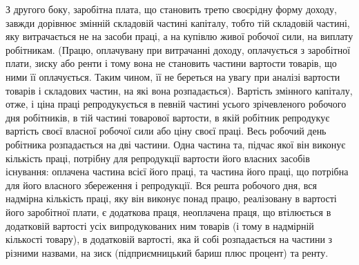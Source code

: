 З другого боку, заробітна плата, що становить третю своєрідну форму
доходу, завжди дорівнює змінній складовій частині капіталу, тобто тій складовій
частині, яку витрачається не на засоби праці, а на купівлю живої робочої
сили, на виплату робітникам. (Працю, оплачувану при витрачанні доходу, оплачується
з заробітної плати, зиску або ренти і тому вона не становить частини
вартости товарів, що ними її оплачується. Таким чином, її не береться на увагу
при аналізі вартости товарів і складових частин, на які вона розпадається).
Вартість змінного капіталу, отже, і ціна праці репродукується в певній частині
усього зрічевленого робочого дня робітників, в тій частині товарової вартости,
в якій робітник репродукує вартість своєї власної робочої сили або ціну своєї
праці. Весь робочий день робітника розпадається на дві частини. Одна частина
та, підчас якої він виконує кількість праці, потрібну для репродукції вартости
його власних засобів існування: оплачена частина всієї його праці, та частина
його праці, що потрібна для його власного збереження і репродукції. Вся решта
робочого дня, вся надмірна кількість праці, яку він виконує понад працю, реалізовану
в вартості його заробітної плати, є додаткова праця, неоплачена праця,
що втілюється в додатковій вартості усіх випродукованих ним товарів (і тому
в надмірній кількості товару), в додатковій вартості, яка й собі розпадається на
частини з різними назвами, на зиск (підприємницький бариш плюс процент)
та ренту.
